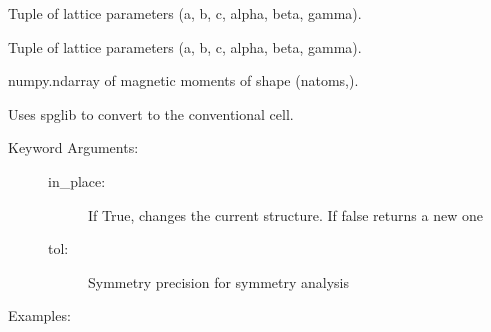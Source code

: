 \documentclass[letterpaper,10pt,english]{sphinxmanual}
\begin{document}
\begin{fulllineitems}
\begin{fulllineitems}
\end{fulllineitems}


\begin{fulllineitems}
\label{models:qmpy.Structure.lat_params}
Tuple of lattice parameters (a, b, c, alpha, beta, gamma).

\end{fulllineitems}


\begin{fulllineitems}
\label{models:qmpy.Structure.lp}
Tuple of lattice parameters (a, b, c, alpha, beta, gamma).

\end{fulllineitems}


\begin{fulllineitems}
\label{models:qmpy.Structure.magmoms}
numpy.ndarray of magnetic moments of shape (natoms,).

\end{fulllineitems}


\begin{fulllineitems}
\label{models:qmpy.Structure.make_conventional}
Uses spglib to convert to the conventional cell.
\begin{description}
\item[{Keyword Arguments:}] \leavevmode\begin{description}
\item[{in\_place: }] \leavevmode
If True, changes the current structure. If false returns
a new one

\item[{tol: }] \leavevmode
Symmetry precision for symmetry analysis

\end{description}

\end{description}

Examples:


\end{fulllineitems}
\end{fulllineitems}
\end{document}
